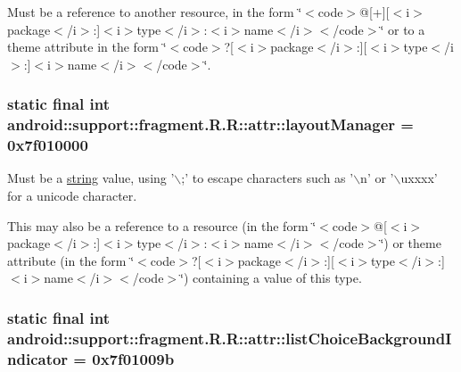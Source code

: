 Must be a reference to another resource, in the form \char`\"{}$<$code$>$@\mbox{[}+\mbox{]}\mbox{[}$<$i$>$package$<$/i$>$:\mbox{]}$<$i$>$type$<$/i$>$:$<$i$>$name$<$/i$>$$<$/code$>$\char`\"{} or to a theme attribute in the form \char`\"{}$<$code$>$?\mbox{[}$<$i$>$package$<$/i$>$:\mbox{]}\mbox{[}$<$i$>$type$<$/i$>$:\mbox{]}$<$i$>$name$<$/i$>$$<$/code$>$\char`\"{}. \hypertarget{classandroid_1_1support_1_1fragment_1_1_r_1_1attr_2eef592840d63176edbfade50dcfd2ad}{
\subsubsection[{layoutManager}]{\setlength{\rightskip}{0pt plus 5cm}static final int android::support::fragment.R.R::attr::layoutManager = 0x7f010000}}
\label{classandroid_1_1support_1_1fragment_1_1_r_1_1attr_2eef592840d63176edbfade50dcfd2ad}


Must be a \hyperlink{classandroid_1_1support_1_1fragment_1_1_r_1_1string}{string} value, using '$\backslash$;' to escape characters such as '$\backslash$n' or '$\backslash$uxxxx' for a unicode character. 

This may also be a reference to a resource (in the form \char`\"{}$<$code$>$@\mbox{[}$<$i$>$package$<$/i$>$:\mbox{]}$<$i$>$type$<$/i$>$:$<$i$>$name$<$/i$>$$<$/code$>$\char`\"{}) or theme attribute (in the form \char`\"{}$<$code$>$?\mbox{[}$<$i$>$package$<$/i$>$:\mbox{]}\mbox{[}$<$i$>$type$<$/i$>$:\mbox{]}$<$i$>$name$<$/i$>$$<$/code$>$\char`\"{}) containing a value of this type. \hypertarget{classandroid_1_1support_1_1fragment_1_1_r_1_1attr_62a204cf31b798a8dbe7541f556e4ac9}{
\subsubsection[{listChoiceBackgroundIndicator}]{\setlength{\rightskip}{0pt plus 5cm}static final int android::support::fragment.R.R::attr::listChoiceBackgroundIndicator = 0x7f01009b}}
\label{classandroid_1_1support_1_1fragment_1_1_r_1_1attr_62a204cf31b798a8dbe7541f556e4ac9}


